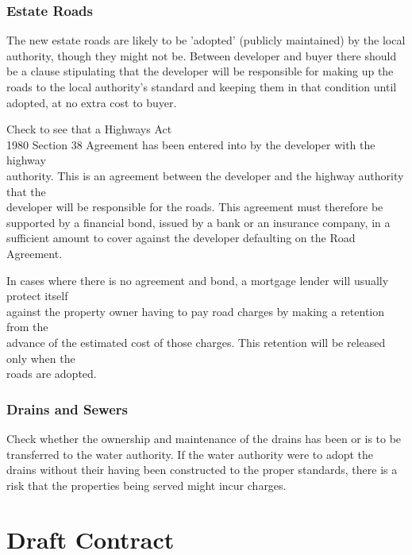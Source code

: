 \documentclass[
]{article}
\begin{document}
\hypertarget{estate-roads}{%
\subsubsection{Estate Roads}\label{estate-roads}}

The new estate roads are likely to be 'adopted' (publicly maintained) by
the local authority, though they might not be. Between developer and
buyer there should be a clause stipulating that the developer will be
responsible for making up the roads to the local authority's standard
and keeping them in that condition until adopted, at no extra cost to
buyer.

Check to see that a Highways Act\\
1980 Section 38 Agreement has been entered into by the developer with
the highway\\
authority. This is an agreement between the developer and the highway
authority that the\\
developer will be responsible for the roads. This agreement must
therefore be supported by a financial bond, issued by a bank or an
insurance company, in a sufficient amount to cover against the developer
defaulting on the Road Agreement.

In cases where there is no agreement and bond, a mortgage lender will
usually protect itself\\
against the property owner having to pay road charges by making a
retention from the\\
advance of the estimated cost of those charges. This retention will be
released only when the\\
roads are adopted.

\hypertarget{drains-and-sewers}{%
\subsubsection{Drains and Sewers}\label{drains-and-sewers}}

Check whether the ownership and maintenance of the drains has been or is
to be transferred to the water authority. If the water authority were to
adopt the drains without their having been constructed to the proper
standards, there is a risk that the properties being served might incur
charges.

\hypertarget{draft-contract}{%
\section{Draft Contract}\label{draft-contract}}
\end{document}
